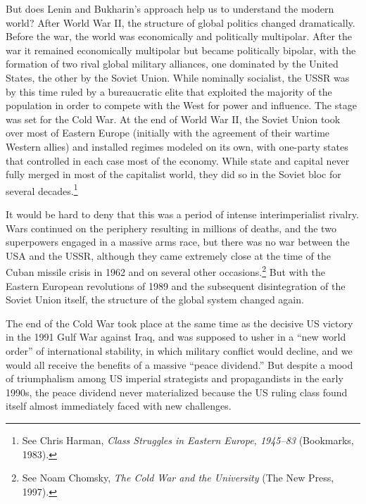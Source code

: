 But does Lenin and Bukharin's approach help us to understand the modern world? After World War II, the structure of global politics changed dramatically. Before the war, the world was economically and politically multipolar. After the war it remained economically multipolar but became politically bipolar, with the formation of two rival global military alliances, one dominated by the United States, the other by the Soviet Union. While nominally socialist, the USSR was by this time ruled by a bureaucratic elite that exploited the majority of the population in order to compete with the West for power and influence. The stage was set for the Cold War. At the end of World War II, the Soviet Union took over most of Eastern Europe (initially with the agreement of their wartime Western allies) and installed regimes modeled on its own, with one-party states that controlled in each case most of the economy. While state and capital never fully merged in most of the capitalist world, they did so in the Soviet bloc for several decades.\footnote{See Chris Harman, \emph{Class Struggles in Eastern Europe, 1945--83} (Bookmarks, 1983).}

It would be hard to deny that this was a period of intense interimperialist rivalry. Wars continued on the periphery resulting in millions of deaths, and the two superpowers engaged in a massive arms race, but there was no war between the USA and the USSR, although they came extremely close at the time of the Cuban missile crisis in 1962 and on several other occasions.\footnote{See Noam Chomsky, \emph{The Cold War and the University} (The New Press, 1997).} But with the Eastern European revolutions of 1989 and the subsequent disintegration of the Soviet Union itself, the structure of the global system changed again.

The end of the Cold War took place at the same time as the decisive US victory in the 1991 Gulf War against Iraq, and was supposed to usher in a ``new world order'' of international stability, in which military conflict would decline, and we would all receive the benefits of a massive ``peace dividend.'' But despite a mood of triumphalism among US imperial strategists and propagandists in the early 1990s, the peace dividend never materialized because the US ruling class found itself almost immediately faced with new challenges.

